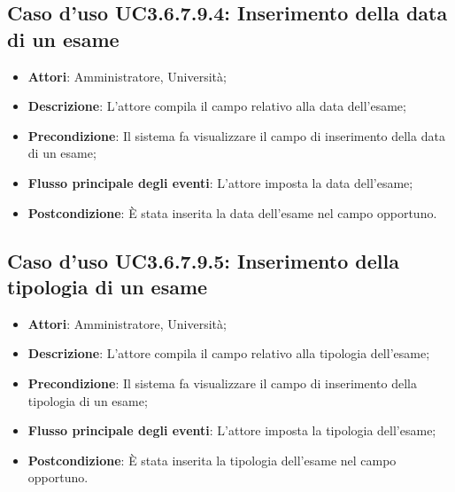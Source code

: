 \subsection{Caso d'uso \texorpdfstring{UC3.6.7.9.4}{UC3.6.7.9.4}: Inserimento della data di un esame}
\begin{itemize}
	\item \textbf{Attori}: Amministratore, Università;
	\item \textbf{Descrizione}: L'attore compila il campo relativo alla data dell’esame;
	
	\item \textbf{Precondizione}: Il sistema fa visualizzare il campo di inserimento della data di un esame;
	
	\item \textbf{Flusso principale degli eventi}: L'attore imposta la data dell’esame;
	
	\item \textbf{Postcondizione}: È stata inserita la data dell'esame nel campo opportuno.
	
\end{itemize}
\subsection{Caso d'uso \texorpdfstring{UC3.6.7.9.5}{UC3.6.7.9.5}: Inserimento della tipologia di un esame}
\begin{itemize}
	\item \textbf{Attori}: Amministratore, Università;
	\item \textbf{Descrizione}: L'attore compila il campo relativo alla tipologia dell’esame;
	
	\item \textbf{Precondizione}: Il sistema fa visualizzare il campo di inserimento della tipologia di un esame;
	
	\item \textbf{Flusso principale degli eventi}: L'attore imposta la tipologia dell’esame;
	
	\item \textbf{Postcondizione}: È stata inserita la tipologia dell'esame nel campo opportuno.
	
\end{itemize}
